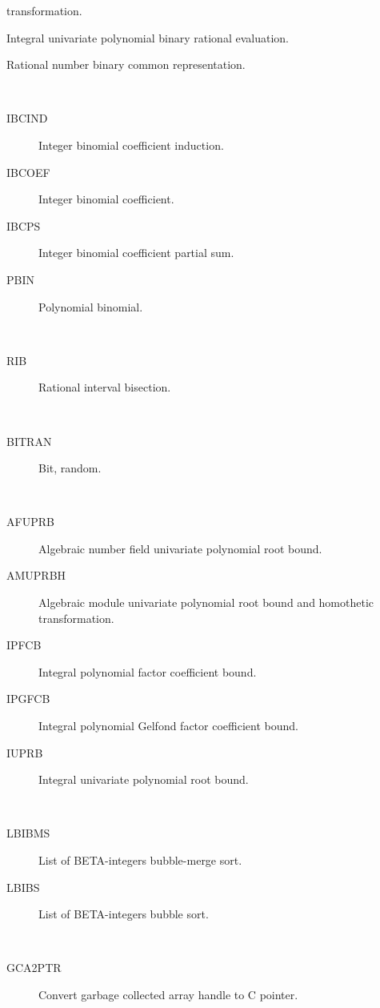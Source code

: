 \begin{description}
\begin{description}
    transformation.
  \item[IUPBRE]  Integral univariate polynomial binary rational evaluation.
  \item[RNBCR]  Rational number binary common representation.
  \end{description}
\item[binomial] \ \ 
  \begin{description}
  \item[IBCIND]  Integer binomial coefficient induction.
  \item[IBCOEF]  Integer binomial coefficient.
  \item[IBCPS]  Integer binomial coefficient partial sum.
  \item[PBIN]  Polynomial binomial.
  \end{description}
\item[bisection] \ \ 
  \begin{description}
  \item[RIB]  Rational interval bisection.
  \end{description}
\item[bit] \ \ 
  \begin{description}
  \item[BITRAN]  Bit, random.
  \end{description}
\item[bound] \ \ 
  \begin{description}
  \item[AFUPRB]  Algebraic number field univariate polynomial root bound.
  \item[AMUPRBH]  Algebraic module univariate polynomial root bound and
    homothetic transformation.
  \item[IPFCB]  Integral polynomial factor coefficient bound.
  \item[IPGFCB]  Integral polynomial Gelfond factor coefficient bound.
  \item[IUPRB]  Integral univariate polynomial root bound.
  \end{description}
\item[bubble] \ \ 
  \begin{description}
  \item[LBIBMS]  List of BETA-integers bubble-merge sort.
  \item[LBIBS]  List of BETA-integers bubble sort.
  \end{description}
\item[c] \ \ 
  \begin{description}
  \item[GCA2PTR]  Convert garbage collected array handle to C pointer.

\end{description}
\end{description}
